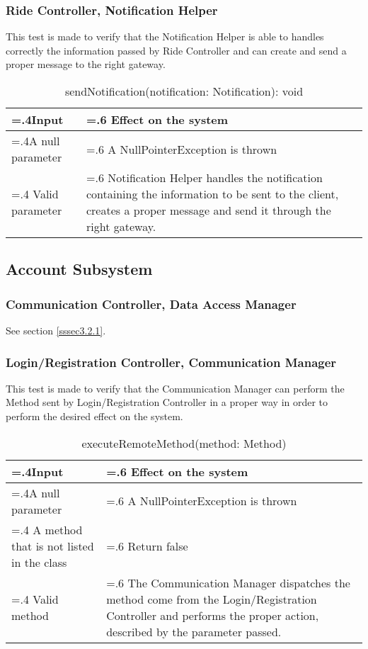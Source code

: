 \documentclass[10pt, a4paper,titlepage]{article}
\begin{document}
\subsubsection{Ride Controller, Notification Helper}
This test is made to verify that the Notification Helper is able to handles correctly the information passed by Ride Controller and can create and send a proper message to the right gateway.
\begin{table}[h]
\caption{sendNotification(notification: Notification): void}
\begin{tabularx}{\textwidth}{|>{\hsize=.4\hsize}X|>{\hsize=.6\hsize}X|}
\hline
Input & Effect on the system\\
\hline
A null parameter & A NullPointerException is thrown\\ 
\hline
Valid parameter & Notification Helper handles the notification containing the information to be sent to the client, creates a proper message and send it through the right gateway.\\
\hline
\end{tabularx}
\end{table}
\linebreak
\subsection{Account Subsystem}
\subsubsection{Communication Controller, Data Access Manager}
See section \ref{sssec3.2.1}.
\subsubsection{Login/Registration Controller, Communication Manager}
This test is made to verify that the Communication Manager can perform the Method sent by Login/Registration Controller in a proper way in order to perform the desired effect on the system.
\begin{table}[h]
\caption{executeRemoteMethod(method: Method)}
\begin{tabularx}{\textwidth}{|>{\hsize=.4\hsize}X|>{\hsize=.6\hsize}X|}
\hline
Input & Effect on the system\\
\hline
A null parameter & A NullPointerException is thrown\\ 
\hline
A method that is not listed in the class & Return false\\
\hline
Valid method & The Communication Manager dispatches the method come from the Login/Registration Controller and performs the proper action, described by the parameter passed.\\
\hline
\end{tabularx}
\end{table}
\end{document}
